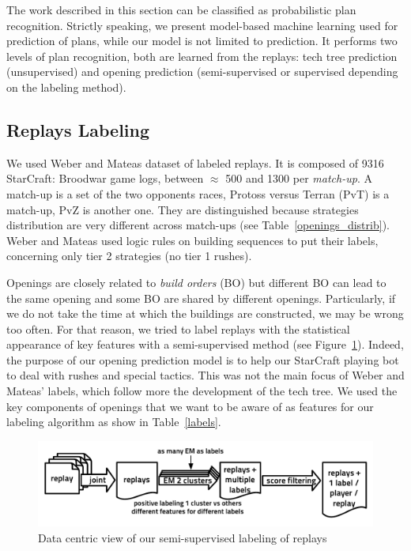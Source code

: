 The work described in this section can be classified as probabilistic plan recognition. Strictly speaking, we present model-based machine learning used for prediction of plans, while our model is not limited to prediction. It performs two levels of plan recognition, both are learned from the replays: tech tree prediction (unsupervised) and opening prediction (semi-supervised or supervised depending on the labeling method).

\subsection{Replays Labeling}
We used Weber and Mateas \citep{weberStrat} dataset of labeled replays. It is composed of 9316 StarCraft: Broodwar game logs, between $\approx$ 500 and 1300 per \textit{match-up}. A match-up is a set of the two opponents races, Protoss versus Terran (PvT) is a match-up, PvZ is another one. They are distinguished because strategies distribution are very different across match-ups (see Table~\ref{openings_distrib}). Weber and Mateas used logic rules on building sequences to put their labels, concerning only tier 2 strategies (no tier 1 rushes).

Openings are closely related to \textit{build orders} (BO) but different BO can lead to the same opening and some BO are shared by different openings. Particularly, if we do not take the time at which the buildings are constructed, we may be wrong too often. For that reason, we tried to label replays with the statistical appearance of key features with a semi-supervised method (see Figure~\ref{replays_labeling}). Indeed, the purpose of our opening prediction model is to help our StarCraft playing bot to deal with rushes and special tactics. This was not the main focus of Weber and Mateas' labels, which follow more the development of the tech tree. We used the key components of openings that we want to be aware of as features for our labeling algorithm as show in Table~\ref{labels}.

\begin{figure}[htp]
\centerline{\includegraphics[width=1.0\columnwidth]{images/replays_labeling.pdf}}
\caption{Data centric view of our semi-supervised labeling of replays}
\label{replays_labeling}
\end{figure}

